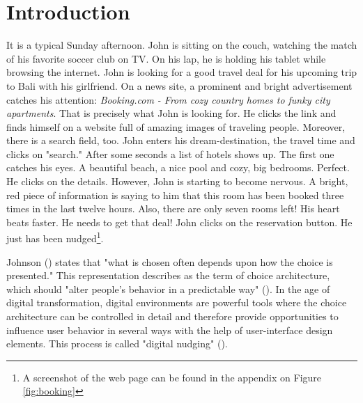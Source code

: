 \section{Introduction}
It is a typical Sunday afternoon. John is sitting on the couch, watching the match of his favorite soccer club on TV. On his lap, he is holding his tablet while browsing the internet. John is looking for a good travel deal for his upcoming trip to Bali with his girlfriend. On a news site, a prominent and bright advertisement catches his attention: \textit{Booking.com - From cozy country homes to funky city apartments}. That is precisely what John is looking for. He clicks the link and finds himself on a website full of amazing images of traveling people. Moreover, there is a search field, too. John enters his dream-destination, the travel time and clicks on "search." After some seconds a list of hotels shows up. The first one catches his eyes. A beautiful beach, a nice pool and cozy, big bedrooms. Perfect. He clicks on the details. However,  John is starting to become nervous. A bright, red piece of information is saying to him that this room has been booked three times in the last twelve hours. Also, there are only seven rooms left! His heart beats faster. He needs to get that deal! John clicks on the reservation button. He just has been nudged\footnote{A screenshot of the web page can be found in the appendix on Figure \ref{fig:booking}}.


Johnson (\citeyear[p.488]{johnson_beyond_2012}) states that "what is chosen often depends upon how the choice is presented." This representation describes as the term of choice architecture, which should "alter people's behavior in a predictable way" (\cite[p.6]{thaler_nudge:_2009}). In the age of digital transformation, digital environments are powerful tools where the choice architecture can be controlled in detail and therefore provide opportunities to influence user behavior in several ways with the help of user-interface design elements. This process is called "digital nudging" (\cite{weinmann_digital_2016}).

